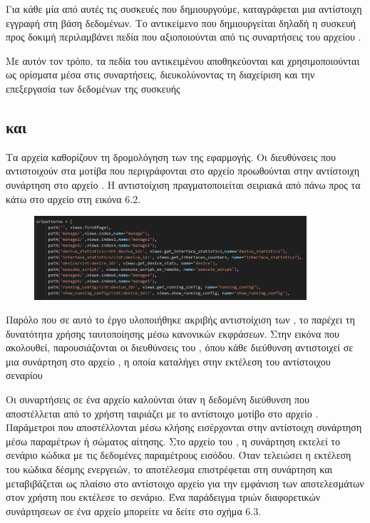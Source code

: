 Για κάθε μία από αυτές τις συσκευές που δημιουργούμε, καταγράφεται μια αντίστοιχη εγγραφή στη βάση δεδομένων. Το αντικείμενο που δημιουργείται δηλαδή η συσκευή προς δοκιμή περιλαμβάνει πεδία που αξιοποιούνται από τις συναρτήσεις του αρχείου .

Με αυτόν τον τρόπο, τα πεδία του αντικειμένου αποθηκεύονται και χρησιμοποιούνται ως ορίσματα μέσα στις συναρτήσεις, διευκολύνοντας τη διαχείριση και την επεξεργασία των δεδομένων της συσκευής




\subsection{ και }
Τα αρχεία  καθορίζουν τη δρομολόγηση των  της εφαρμογής. 
Οι διευθύνσεις  που αντιστοιχούν στα μοτίβα που περιγράφονται στο αρχείο  
προωθούνται στην αντίστοιχη συνάρτηση στο αρχείο . 
Η αντιστοίχιση πραγματοποιείται σειριακά από πάνω προς τα κάτω στο αρχείο  στη εικόνα 6.2. 

\FloatBarrier

\begin{figure}[htb]
	\centering
	\includegraphics[width=0.9\textwidth]{graphics/urlpy.png}
	\caption{ }
\end{figure}

\FloatBarrier

Παρόλο που σε αυτό το έργο υλοποιήθηκε ακριβής αντιστοίχιση των , το  παρέχει τη 
δυνατότητα χρήσης ταυτοποίησης μέσω κανονικών εκφράσεων. Στην εικόνα που ακολουθεί, παρουσιάζονται οι 
διευθύνσεις  του , όπου κάθε διεύθυνση αντιστοιχεί σε μια συνάρτηση στο αρχείο , 
η οποία καταλήγει στην εκτέλεση του αντίστοιχου σεναρίου



Οι συναρτήσεις σε ένα αρχείο  καλούνται όταν η δεδομένη διεύθυνση  που αποστέλλεται από το
χρήστη ταιριάζει με το αντίστοιχο μοτίβο  στο αρχείο . Παράμετροι που αποστέλλονται μέσω κλήσης
 εισέρχονται στην αντίστοιχη συνάρτηση μέσω παραμέτρων ή σώματος αίτησης. Στο αρχείο  του , η συνάρτηση εκτελεί το σενάριο
κώδικα με τις δεδομένες παραμέτρους εισόδου. Όταν τελειώσει η εκτέλεση του κώδικα δέσμης ενεργειών,
το αποτέλεσμα επιστρέφεται στη συνάρτηση  και μεταβιβάζεται ως πλαίσιο στο αντίστοιχο αρχείο  για την εμφάνιση των αποτελεσμάτων στον χρήστη που εκτέλεσε το σενάριο.
Ένα παράδειγμα τριών διαφορετικών συνάρτησεων σε ένα αρχείο  μπορείτε να δείτε στο σχήμα 6.3.

